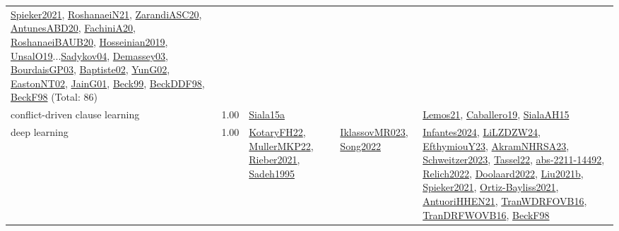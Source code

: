 {\begin{longtable}{p{3cm}r>{\raggedright\arraybackslash}p{6cm}>{\raggedright\arraybackslash}p{6cm}>{\raggedright\arraybackslash}p{8cm}}
\hyperref[detail:Spieker2021]{Spieker2021}, \hyperref[detail:RoshanaeiN21]{RoshanaeiN21}, \hyperref[detail:ZarandiASC20]{ZarandiASC20}, \hyperref[detail:AntunesABD20]{AntunesABD20}, \hyperref[detail:FachiniA20]{FachiniA20}, \hyperref[detail:RoshanaeiBAUB20]{RoshanaeiBAUB20}, \hyperref[detail:Hosseinian2019]{Hosseinian2019}, \hyperref[detail:UnsalO19]{UnsalO19}...\hyperref[detail:Sadykov04]{Sadykov04}, \hyperref[detail:Demassey03]{Demassey03}, \hyperref[detail:BourdaisGP03]{BourdaisGP03}, \hyperref[detail:Baptiste02]{Baptiste02}, \hyperref[detail:YunG02]{YunG02}, \hyperref[detail:EastonNT02]{EastonNT02}, \hyperref[detail:JainG01]{JainG01}, \hyperref[detail:Beck99]{Beck99}, \hyperref[detail:BeckDDF98]{BeckDDF98}, \hyperref[detail:BeckF98]{BeckF98} (Total: 86)\\
\index{conflict-driven clause learning}\index{Algorithms!conflict-driven clause learning}conflict-driven clause learning &  1.00 & \hyperref[detail:Siala15a]{Siala15a} &  & \hyperref[detail:Lemos21]{Lemos21}, \hyperref[detail:Caballero19]{Caballero19}, \hyperref[detail:SialaAH15]{SialaAH15}\\
\index{deep learning}\index{Algorithms!deep learning}deep learning &  1.00 & \hyperref[detail:KotaryFH22]{KotaryFH22}, \hyperref[detail:MullerMKP22]{MullerMKP22}, \hyperref[detail:Rieber2021]{Rieber2021}, \hyperref[detail:Sadeh1995]{Sadeh1995} & \hyperref[detail:IklassovMR023]{IklassovMR023}, \hyperref[detail:Song2022]{Song2022} & \hyperref[detail:Infantes2024]{Infantes2024}, \hyperref[detail:LiLZDZW24]{LiLZDZW24}, \hyperref[detail:EfthymiouY23]{EfthymiouY23}, \hyperref[detail:AkramNHRSA23]{AkramNHRSA23}, \hyperref[detail:Schweitzer2023]{Schweitzer2023}, \hyperref[detail:Tassel22]{Tassel22}, \hyperref[detail:abs-2211-14492]{abs-2211-14492}, \hyperref[detail:Relich2022]{Relich2022}, \hyperref[detail:Doolaard2022]{Doolaard2022}, \hyperref[detail:Liu2021b]{Liu2021b}, \hyperref[detail:Spieker2021]{Spieker2021}, \hyperref[detail:Ortiz-Bayliss2021]{Ortiz-Bayliss2021}, \hyperref[detail:AntuoriHHEN21]{AntuoriHHEN21}, \hyperref[detail:TranWDRFOVB16]{TranWDRFOVB16}, \hyperref[detail:TranDRFWOVB16]{TranDRFWOVB16}, \hyperref[detail:BeckF98]{BeckF98}\\

\end{longtable}}
